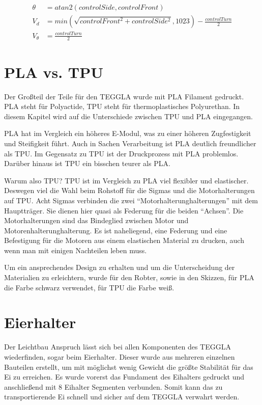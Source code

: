 \begin{align}
	\theta &= atan2(controlSide, controlFront)\\
	V_d &= min(\sqrt{controlFront^2 + controlSide^2}, 1023) - \frac{controlTurn}{2}\\
	V_\theta &= \frac{controlTurn}{2}
\end{align}


\section{PLA vs. TPU}
Der Großteil der Teile für den TEGGLA wurde mit PLA Filament gedruckt. 
PLA steht für Polyactide, TPU steht für thermoplastisches Polyurethan. 
In diesem Kapitel wird auf die Unterschiede zwischen TPU und PLA eingegangen. 

PLA hat im Vergleich ein höheres E-Modul, was zu einer höheren Zugfestigkeit und Steifigkeit führt. 
Auch in Sachen Verarbeitung ist PLA deutlich freundlicher als TPU. 
Im Gegensatz zu TPU ist der Druckprozess mit PLA problemlos. 
Darüber hinaus ist TPU ein bisschen teurer als PLA. 

Warum also TPU? TPU ist im Vergleich zu PLA viel flexibler und elastischer. 
Deswegen viel die Wahl beim Rohstoff für die Sigmas und die Motorhalterungen auf TPU. 
Acht Sigmas verbinden die zwei ``Motorhalterunghalterungen'' mit dem Hauptträger. 
Sie dienen hier quasi als Federung für die beiden ``Achsen''. 
Die Motorhalterungen sind das Bindeglied zwischen Motor und Motorenhalterunghalterung. 
Es ist naheliegend, eine Federung und eine Befestigung für die Motoren aus einem elastischen Material zu drucken, auch wenn man mit einigen Nachteilen leben muss.

Um ein ansprechendes Design zu erhalten und um die Unterscheidung der Materialien zu erleichtern, wurde für den Robter, sowie in den Skizzen, für PLA die Farbe schwarz verwendet, für TPU die Farbe weiß.


\section{Eierhalter}					
Der Leichtbau Anspruch lässt sich bei allen Komponenten des TEGGLA wiederfinden, sogar beim Eierhalter. 
Dieser wurde aus mehreren einzelnen Bauteilen erstellt, um mit möglichst wenig Gewicht die größte Stabilität für das Ei zu erreichen. 
Es wurde vorerst das Fundament des Eihalters gedruckt und anschließend mit 8 Eihalter Segmenten verbunden. 
Somit kann das zu transportierende Ei schnell und sicher auf dem TEGGLA verwahrt werden. 

